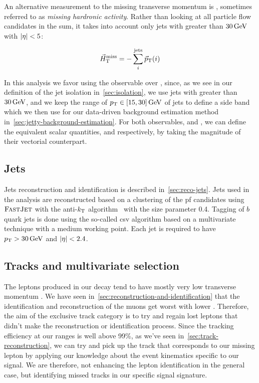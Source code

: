 An alternative measurement to the missing transverse momentum is \htvecmiss, sometimes referred to as \emph{missing hardronic activity}. Rather than looking at all particle flow candidates in the sum, it takes into account only jets with \pt greater than $30\,\text{Ge\hspace{-.08em}V}$ with $\lvert \eta \rvert<5$:

\begin{equation}
\vec{H}_{\text{T}}^{\text{miss}} = -\sum_i^{\mathrm{jets}} {\vec p}_{\mathrm{T}}(i)
\end{equation}

In this analysis we favor using the observable \htvecmiss over \VEtmiss, since, as we see in our definition of the jet isolation in~\ref{sec:isolation}, we use jets with \pt greater than $30\,\text{Ge\hspace{-.08em}V}$, and we keep the range of $p_{\mathrm{T}}\in [15,30]\,\text{Ge\hspace{-.08em}V}$ of jets to define a side band which we then use for our data-driven background estimation method in~\ref{sec:jetty-background-estimation}.  For both observables, \VEtmiss and \htvecmiss, we can define the equivalent scalar quantities, \MET and \mht respectively, by taking the magnitude of their vectorial counterpart.

\subsection{Jets}
\label{subsec:jets}

Jets reconstruction and identification is described in~\ref{sec:reco-jets}. Jets used in the analysis are reconstructed based on a clustering of the \gls{pf} candidates using ${\textsc{FastJet}}$ with the anti-$k_{\mathrm{T}}$ algorithm~\cite{Cacciari_2008_antikt} with the size parameter 0.4. Tagging of $b$ quark jets is done using the so-called \gls{csv} algorithm based on a multivari­ate technique \DEEPCSV with a medium working point. Each jet is required to have $p_{\mathrm{T}}>30\,\text{Ge\hspace{-.08em}V}$ and $\lvert \eta \rvert<2.4$.

\clearpage
\subsection{Tracks and multivariate selection }
\label{sec:track-bdt}
The leptons \ellell produced in our decay \neuttdecay tend to have mostly very low transverse momentum \pt. We have seen in~\ref{sec:reconstruction-and-identification} that the identification and reconstruction of the muons get worst with lower \pt. Therefore, the aim of the exclusive track category is to try and regain lost leptons that didn't make the reconstruction or identification process. Since the tracking efficiency at our \pt ranges is well above 99\%, as we've seen in~\ref{sec:track-reconstruction}, we can try and pick up the track that corresponds to our missing lepton by applying our knowledge about the event kinematics specific to our signal. We are therefore, not enhancing the lepton identification in the general case, but identifying missed tracks in our specific signal signature.

